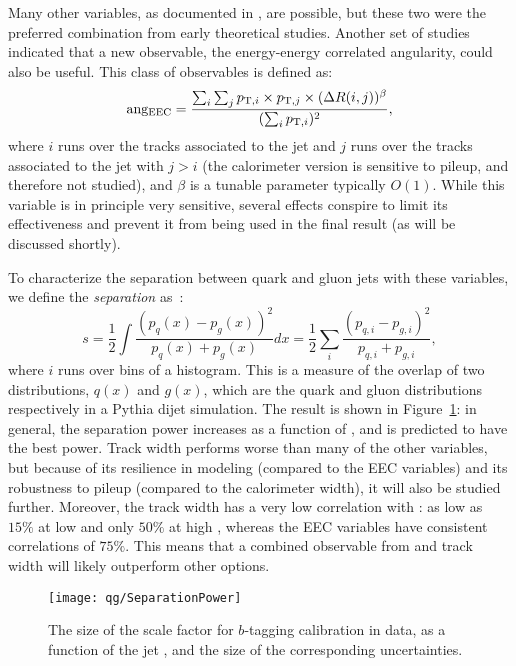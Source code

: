 Many other variables, as documented in \cite{schwartz1}, are possible, but these two were the preferred combination from early theoretical studies. Another set of studies~\cite{EEC} indicated that a new observable, the energy-energy correlated angularity, could also be useful. This class of observables is defined as:
\begin{equation}
{\rm ang_{\rm EEC}}=\frac{ \sum_i \sum_j p_{{\rm T},i} \times p_{{\rm T},j} \times (\Delta R(i,j))^\beta}{ (\sum_i p_{{\rm T},i})^2 },
\end{equation}
where $i$ runs over the tracks associated to the jet and $j$ runs over the tracks associated to the jet with $j>i$ (the calorimeter version is sensitive to pileup, and therefore not studied), and $\beta$ is a tunable parameter typically $O(1)$. While this variable is in principle very sensitive, several effects conspire to limit its effectiveness and prevent it from being used in the final result (as will be discussed shortly).

To characterize the separation between quark and gluon jets with these variables, we define the \textit{separation} as~\cite{2006physics11219P}:
%
\begin{equation}
s=\frac{1}{2}\int\frac{(p_q(x)-p_g(x))^2}{p_q(x)+p_g(x)}dx = \frac{1}{2}\sum_i\frac{(p_{q,i}-p_{g,i})^2}{p_{q,i}+p_{g,i}}, 
\label{eq:separation}
\end{equation}
%
where $i$ runs over bins of a histogram. This is a measure of the overlap of two distributions, $q(x)$ and $g(x)$, which are the quark and gluon distributions respectively in a Pythia dijet simulation.  The result is shown in Figure~\ref{fig:jet-reconstruction:qg:separation}: in general, the separation power increases as a function of \pt, and \ntrk is predicted to have the best power. Track width performs worse than many of the other variables, but because of its resilience in modeling (compared to the EEC variables) and its robustness to pileup (compared to the calorimeter width), it will also be studied further. Moreover, the track width has a very low correlation with \ntrk: as low as $15\%$ at low \pt and only $50\%$ at high \pt, whereas the EEC variables have consistent correlations of $75\%$. This means that a combined observable from \ntrk and track width will likely outperform other options.


\begin{figure}
\centering
\texttt{[image: qg/SeparationPower]}
\label{fig:jet-reconstruction:qg:separation}
\caption{The size of the scale factor for $b$-tagging calibration in data, as a function of the jet \pt, and the size of the corresponding uncertainties.}
\end{figure}

